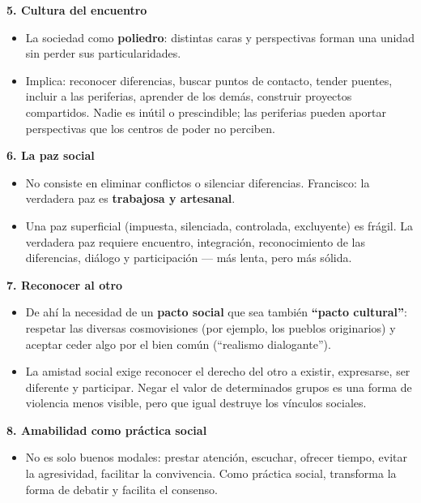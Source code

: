 \documentclass[10pt,a4paper]{article}
\begin{document}
\medskip\noindent \textbf{5. Cultura del encuentro}\par\nopagebreak
\begin{itemize}
\item La sociedad como \textbf{poliedro}: distintas caras y perspectivas forman una unidad sin perder sus particularidades.
\item Implica: reconocer diferencias, buscar puntos de contacto, tender puentes, incluir a las periferias, aprender de los demás, construir proyectos compartidos. Nadie es inútil o prescindible; las periferias pueden aportar perspectivas que los centros de poder no perciben.
\end{itemize}

\medskip\noindent \textbf{6. La paz social}\par\nopagebreak
\begin{itemize}
\item No consiste en eliminar conflictos o silenciar diferencias. Francisco: la verdadera paz es \textbf{trabajosa y artesanal}.
\item Una paz superficial (impuesta, silenciada, controlada, excluyente) es frágil. La verdadera paz requiere encuentro, integración, reconocimiento de las diferencias, diálogo y participación --- más lenta, pero más sólida.
\end{itemize}

\medskip\noindent \textbf{7. Reconocer al otro}\par\nopagebreak
\begin{itemize}
\item De ahí la necesidad de un \textbf{pacto social} que sea también \textbf{``pacto cultural''}: respetar las diversas cosmovisiones (por ejemplo, los pueblos originarios) y aceptar ceder algo por el bien común (``realismo dialogante'').
\item La amistad social exige reconocer el derecho del otro a existir, expresarse, ser diferente y participar. Negar el valor de determinados grupos es una forma de violencia menos visible, pero que igual destruye los vínculos sociales.
\end{itemize}

\medskip\noindent \textbf{8. Amabilidad como práctica social}\par\nopagebreak
\begin{itemize}
\item No es solo buenos modales: prestar atención, escuchar, ofrecer tiempo, evitar la agresividad, facilitar la convivencia. Como práctica social, transforma la forma de debatir y facilita el consenso.
\end{itemize}
\end{document}
